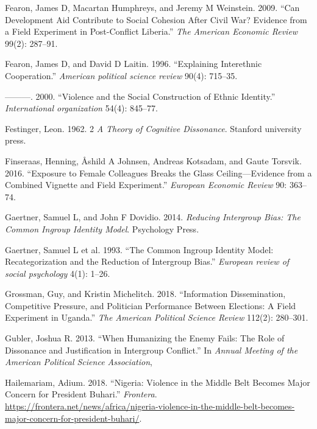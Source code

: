 \documentclass[11pt]{article}
\begin{document}
\begin{cslreferences}
\leavevmode\hypertarget{ref-fearon2009can}{}%
Fearon, James D, Macartan Humphreys, and Jeremy M Weinstein. 2009. ``Can
Development Aid Contribute to Social Cohesion After Civil War? Evidence
from a Field Experiment in Post-Conflict Liberia.'' \emph{The American
Economic Review} 99(2): 287--91.

\leavevmode\hypertarget{ref-fearon1996explaining}{}%
Fearon, James D, and David D Laitin. 1996. ``Explaining Interethnic
Cooperation.'' \emph{American political science review} 90(4): 715--35.

\leavevmode\hypertarget{ref-fearon2000violence}{}%
---------. 2000. ``Violence and the Social Construction of Ethnic
Identity.'' \emph{International organization} 54(4): 845--77.

\leavevmode\hypertarget{ref-festinger1962cognitiveDissonance}{}%
Festinger, Leon. 1962. 2 \emph{A Theory of Cognitive Dissonance}.
Stanford university press.

\leavevmode\hypertarget{ref-finseraas2016women}{}%
Finseraas, Henning, Åshild A Johnsen, Andreas Kotsadam, and Gaute
Torsvik. 2016. ``Exposure to Female Colleagues Breaks the Glass
Ceiling---Evidence from a Combined Vignette and Field Experiment.''
\emph{European Economic Review} 90: 363--74.

\leavevmode\hypertarget{ref-gaertner2014reducing}{}%
Gaertner, Samuel L, and John F Dovidio. 2014. \emph{Reducing Intergroup
Bias: The Common Ingroup Identity Model}. Psychology Press.

\leavevmode\hypertarget{ref-gaertner1993common}{}%
Gaertner, Samuel L et al. 1993. ``The Common Ingroup Identity Model:
Recategorization and the Reduction of Intergroup Bias.'' \emph{European
review of social psychology} 4(1): 1--26.

\leavevmode\hypertarget{ref-grossman2018information}{}%
Grossman, Guy, and Kristin Michelitch. 2018. ``Information
Dissemination, Competitive Pressure, and Politician Performance Between
Elections: A Field Experiment in Uganda.'' \emph{The American Political
Science Review} 112(2): 280--301.

\leavevmode\hypertarget{ref-gubler2013humanizing}{}%
Gubler, Joshua R. 2013. ``When Humanizing the Enemy Fails: The Role of
Dissonance and Justification in Intergroup Conflict.'' In \emph{Annual
Meeting of the American Political Science Association},

\leavevmode\hypertarget{ref-frontera2018nigeria}{}%
Hailemariam, Adium. 2018. ``Nigeria: Violence in the Middle Belt Becomes
Major Concern for President Buhari.'' \emph{Frontera}.
\url{https://frontera.net/news/africa/nigeria-violence-in-the-middle-belt-becomes-major-concern-for-president-buhari/}.


\end{cslreferences}
\end{document}
